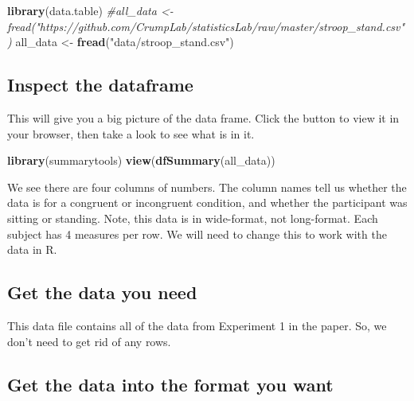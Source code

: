 \documentclass[
]{book}
\newenvironment{Shaded}{\begin{snugshade}}{\end{snugshade}}
\newcommand{\CommentTok}[1]{\textcolor[rgb]{0.56,0.35,0.01}{\textit{#1}}}
\newcommand{\FunctionTok}[1]{\textcolor[rgb]{0.13,0.29,0.53}{\textbf{#1}}}
\newcommand{\NormalTok}[1]{#1}
\newcommand{\OtherTok}[1]{\textcolor[rgb]{0.56,0.35,0.01}{#1}}
\newcommand{\StringTok}[1]{\textcolor[rgb]{0.31,0.60,0.02}{#1}}
\begin{document}
\begin{Shaded}
\begin{Highlighting}[]
\FunctionTok{library}\NormalTok{(data.table)}
\CommentTok{\#all\_data \textless{}{-} fread("https://github.com/CrumpLab/statisticsLab/raw/master/stroop\_stand.csv")}
\NormalTok{all\_data }\OtherTok{\textless{}{-}} \FunctionTok{fread}\NormalTok{(}\StringTok{"data/stroop\_stand.csv"}\NormalTok{)}
\end{Highlighting}
\end{Shaded}

\hypertarget{inspect-the-dataframe-2}{%
\subsection{Inspect the dataframe}\label{inspect-the-dataframe-2}}

This will give you a big picture of the data frame. Click the button to
view it in your browser, then take a look to see what is in it.

\begin{Shaded}
\begin{Highlighting}[]
\FunctionTok{library}\NormalTok{(summarytools)}
\FunctionTok{view}\NormalTok{(}\FunctionTok{dfSummary}\NormalTok{(all\_data))}
\end{Highlighting}
\end{Shaded}

We see there are four columns of numbers. The column names tell us
whether the data is for a congruent or incongruent condition, and
whether the participant was sitting or standing. Note, this data is in
wide-format, not long-format. Each subject has 4 measures per row. We
will need to change this to work with the data in R.

\hypertarget{get-the-data-you-need-2}{%
\subsection{Get the data you need}\label{get-the-data-you-need-2}}

This data file contains all of the data from Experiment 1 in the paper.
So, we don't need to get rid of any rows.

\hypertarget{get-the-data-into-the-format-you-want}{%
\subsection{Get the data into the format you want}\label{get-the-data-into-the-format-you-want}}
\end{document}
